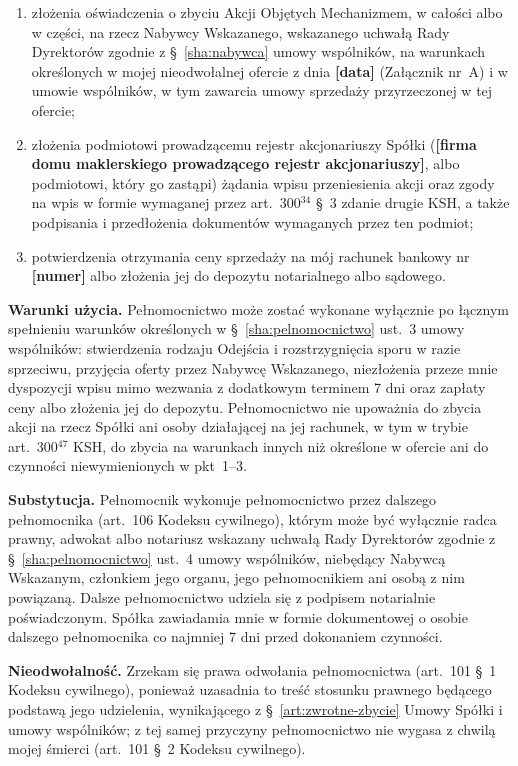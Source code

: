 \documentclass[12pt,a4paper]{report}
\newcommand{\field}[1]{\textbf{[#1]}}
\begin{document}
\begin{enumerate}
  \item złożenia oświadczenia o zbyciu Akcji Objętych Mechanizmem, w całości albo w części, na rzecz Nabywcy Wskazanego, wskazanego uchwałą Rady Dyrektorów zgodnie z §~\ref{sha:nabywca} umowy wspólników, na warunkach określonych w mojej nieodwołalnej ofercie z dnia \field{data} (Załącznik nr~A) i w umowie wspólników, w tym zawarcia umowy sprzedaży przyrzeczonej w tej ofercie;
  \item złożenia podmiotowi prowadzącemu rejestr akcjonariuszy Spółki (\field{firma domu maklerskiego prowadzącego rejestr akcjonariuszy}, albo podmiotowi, który go zastąpi) żądania wpisu przeniesienia akcji oraz zgody na wpis w formie wymaganej przez art.~300$^{34}$ §~3 zdanie drugie KSH, a także podpisania i przedłożenia dokumentów wymaganych przez ten podmiot;
  \item potwierdzenia otrzymania ceny sprzedaży na mój rachunek bankowy nr \field{numer} albo złożenia jej do depozytu notarialnego albo sądowego.
\end{enumerate}

\textbf{Warunki użycia.} Pełnomocnictwo może zostać wykonane wyłącznie po łącznym spełnieniu warunków określonych w §~\ref{sha:pelnomocnictwo} ust.~3 umowy wspólników: stwierdzenia rodzaju Odejścia i rozstrzygnięcia sporu w razie sprzeciwu, przyjęcia oferty przez Nabywcę Wskazanego, niezłożenia przeze mnie dyspozycji wpisu mimo wezwania z dodatkowym terminem 7 dni oraz zapłaty ceny albo złożenia jej do depozytu. Pełnomocnictwo nie upoważnia do zbycia akcji na rzecz Spółki ani osoby działającej na jej rachunek, w tym w trybie art.~300$^{47}$ KSH, do zbycia na warunkach innych niż określone w ofercie ani do czynności niewymienionych w pkt~1--3.

\textbf{Substytucja.} Pełnomocnik wykonuje pełnomocnictwo przez dalszego pełnomocnika (art.~106 Kodeksu cywilnego), którym może być wyłącznie radca prawny, adwokat albo notariusz wskazany uchwałą Rady Dyrektorów zgodnie z §~\ref{sha:pelnomocnictwo} ust.~4 umowy wspólników, niebędący Nabywcą Wskazanym, członkiem jego organu, jego pełnomocnikiem ani osobą z nim powiązaną. Dalsze pełnomocnictwo udziela się z podpisem notarialnie poświadczonym. Spółka zawiadamia mnie w formie dokumentowej o osobie dalszego pełnomocnika co najmniej 7 dni przed dokonaniem czynności.

\textbf{Nieodwołalność.} Zrzekam się prawa odwołania pełnomocnictwa (art.~101 §~1 Kodeksu cywilnego), ponieważ uzasadnia to treść stosunku prawnego będącego podstawą jego udzielenia, wynikającego z §~\ref{art:zwrotne-zbycie} Umowy Spółki i umowy wspólników; z tej samej przyczyny pełnomocnictwo nie wygasa z chwilą mojej śmierci (art.~101 §~2 Kodeksu cywilnego).
\end{document}
